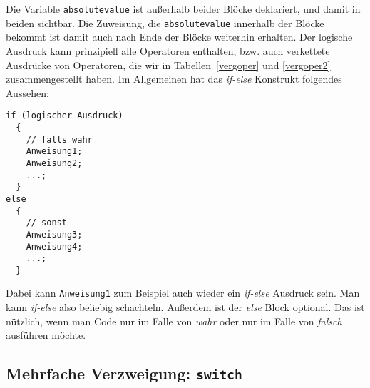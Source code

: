 Die Variable \verb|absolutevalue| ist außerhalb beider Blöcke deklariert, und damit in beiden sichtbar.
Die Zuweisung, die \verb|absolutevalue| innerhalb der Blöcke bekommt ist damit auch nach Ende der Blöcke weiterhin erhalten.
Der logische Ausdruck kann prinzipiell alle Operatoren enthalten, bzw. auch verkettete Ausdrücke von Operatoren, die wir in Tabellen~\ref{vergoper} und \ref{vergoper2} zusammengestellt haben.
Im Allgemeinen hat das \emph{if-else} Konstrukt folgendes Aussehen:
\begin{lstlisting}[caption={if-else Statement}, belowcaptionskip=0.3em]
if (logischer Ausdruck)
  {
    // falls wahr
    Anweisung1;
    Anweisung2;
    ...;
  }
else
  {
    // sonst
    Anweisung3;
    Anweisung4;
    ...;
  }
\end{lstlisting}
Dabei kann \verb|Anweisung1| zum Beispiel auch wieder ein \emph{if-else} Ausdruck sein. 
Man kann \emph{if-else} also beliebig schachteln.
Außerdem ist der \emph{else} Block optional.
Das ist nützlich, wenn man Code nur im Falle von \emph{wahr} oder nur im Falle von \emph{falsch} ausführen möchte.

\subsection{Mehrfache Verzweigung: \texttt{switch}}
 
